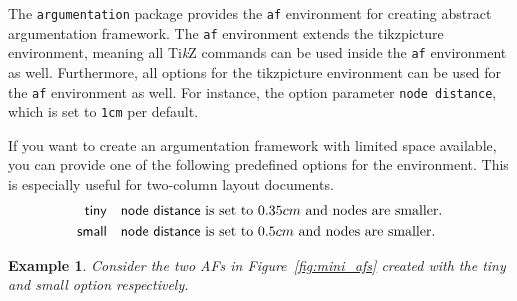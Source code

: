 \documentclass{article}
\newcommand{\tikzname}{Ti\emph{k}Z\xspace}
\newcommand{\argumentation}{\texttt{argumentation}\xspace}
\newtheorem{example}{Example}
\begin{document}
\begin{list}{}{\leftmargin=\parindent\rightmargin=0pt}
    \item
    The \argumentation package provides the \texttt{af} environment for creating abstract argumentation framework.
    The \texttt{af} environment extends the \textsf{tikzpicture} environment, meaning all \tikzname commands can be used inside the \texttt{af} environment as well.
    Furthermore, all options for the \textsf{tikzpicture} environment can be used for the \texttt{af} environment as well.
    For instance, the option parameter \verb|node distance|, which is set to \verb|1cm| per default.

    If you want to create an argumentation framework with limited space available, you can provide one of the following predefined options for the environment. This is especially useful for two-column layout documents.
    \begin{align*}
        \mathsf{tiny} &\quad \text{\textsf{node distance} is set to $0.35cm$ and nodes are smaller.}\\
        \mathsf{small} &\quad \text{\textsf{node distance} is set to $0.5cm$ and nodes are smaller.}\\
    \end{align*}

    \begin{example}
        Consider the two AFs in Figure~\ref{fig:mini_afs} created with the \textsf{tiny} and \textsf{small} option respectively.
    \end{example}
\end{list}
\end{document}
